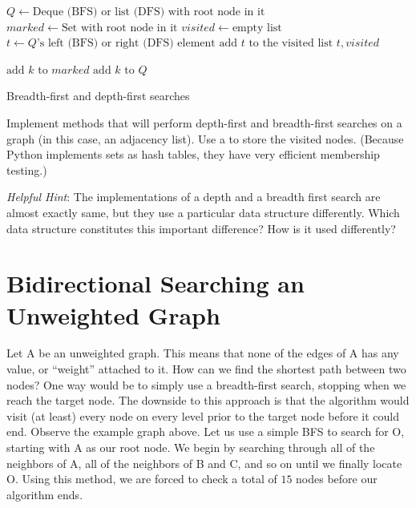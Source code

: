 \begin{algorithm}
\begin{algorithmic}[1]
	\State $Q \gets \text{Deque (BFS) or list (DFS) with root node in it}$	
	\State $marked \gets \text{Set with root node in it}$	
	\State $visited \gets \text{empty list}$	
							
		\State $t \gets Q\text{'s left (BFS) or right (DFS) element}$	
		\State $\text{add }t \text{ to the visited list}$
									
			\State {} $t,visited$
		
		\Else										{}
					\State $\text{add } k \text{ to } marked$
					\State $\text{add } k \text{ to } Q$
				\EndIf
			\EndFor
		\EndIf
	\EndWhile
\EndProcedure
\end{algorithmic}
\caption{Breadth-first and depth-first searches}
\label{alg:BFSDFS}
\end{algorithm}

\begin{problem}
Implement methods that will perform depth-first and breadth-first searches on a graph 
(in this case, an adjacency list). Use a  to store the visited nodes. 
(Because Python implements sets as hash tables, they have very efficient membership 
testing.)

\emph{Helpful Hint}: The implementations of a depth and a breadth first search
are almost exactly same, but they use a particular data structure differently.
Which data structure constitutes this important difference? How is it used differently?
\end{problem}

\section*{Bidirectional Searching an Unweighted Graph}

Let A be an unweighted graph. This means that none of the edges of A has any value, or ``weight'' attached to it. How can we find the shortest path between two nodes?
One way would be to simply use a breadth-first search, stopping when we reach the 
target node. The downside to this approach is that the algorithm would visit (at least)
every node on every level prior to the target node before it could end. Observe the example graph above. 
Let us use a simple BFS to search for O, starting with A as our root node.
We begin by searching through all of the neighbors of A, all of the neighbors of B 
and C, and so on until we finally locate O. Using this method, we are forced to check
a total of $15$ nodes before our algorithm ends.

